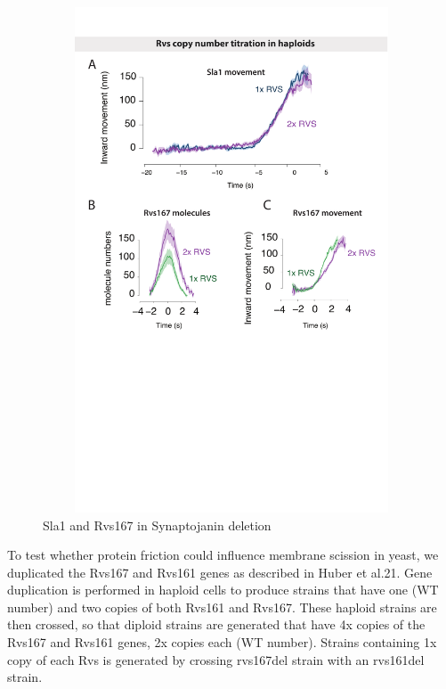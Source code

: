 				\begin{figure}
			\centering
			\includegraphics[width=15cm,height=15cm,keepaspectratio]{figures/results_final/rvs_haploid}
			\caption[Overexpression of the Rvs complex]
			{Sla1 and Rvs167 in Synaptojanin deletion
			 \label{fig5}}
			\end{figure}	
		

	To test whether protein friction could influence membrane scission in yeast, we duplicated the Rvs167 and Rvs161 genes as described in Huber et al.21. Gene duplication is performed in haploid cells to produce strains that have one (WT number) and two copies of both Rvs161 and Rvs167. These haploid strains are then crossed, so that diploid strains are generated that have 4x copies of the Rvs167 and Rvs161 genes, 2x copies each (WT number). Strains containing 1x copy of each Rvs is generated by crossing rvs167del strain with an rvs161del strain.
	


